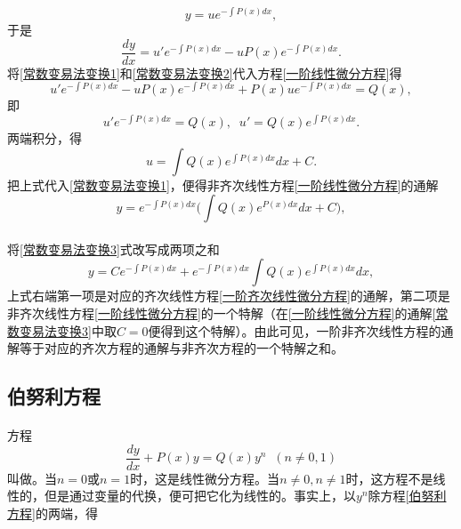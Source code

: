 \begin{equation}
  \label{常数变易法变换1}
  y = ue^{-\int P(x)dx},
\end{equation}
于是
\begin{equation}
  \label{常数变易法变换2}
  \frac{dy}{dx} = u'e^{-\int P(x)dx} - uP(x)e^{-\int P(x)dx}.
\end{equation}
将\eqref{常数变易法变换1}和\eqref{常数变易法变换2}代入方程\eqref{一阶线性微分方程}得
\begin{equation*}
  u'e^{-\int P(x)dx} - uP(x)e^{-\int P(x)dx} + P(x)ue^{-\int P(x)dx} = Q(x),
\end{equation*}
即
\begin{equation*}
  u'e^{-\int P(x)dx} = Q(x), \;\; u' = Q(x)e^{\int P(x)dx}.
\end{equation*}
两端积分，得
\begin{equation*}
  u=\int Q(x)e^{\int P(x)dx}dx + C.
\end{equation*}
把上式代入\eqref{常数变易法变换1}，便得非齐次线性方程\eqref{一阶线性微分方程}的通解
\begin{equation}
  \label{常数变易法变换3}
  y = e^{-\int P(x)dx}\big( \int Q(x)e^{P(x)dx}dx + C \big),
\end{equation}

\paragraph{}
将\eqref{常数变易法变换3}式改写成两项之和
\begin{equation*}
  y = Ce^{-\int P(x)dx} + e^{-\int P(x)dx}\int Q(x)e^{\int P(x)dx}dx,
\end{equation*}
上式右端第一项是对应的齐次线性方程\eqref{一阶齐次线性微分方程}的通解，第二项是非齐次线性方程\eqref{一阶线性微分方程}的一个特解（在\eqref{一阶线性微分方程}的通解\eqref{常数变易法变换3}中取$C=0$便得到这个特解）。由此可见，一阶非齐次线性方程的通解等于对应的齐次方程的通解与非齐次方程的一个特解之和。

\subsection{伯努利方程}
\paragraph{}
方程
\begin{equation}
  \label{伯努利方程}
  \frac{dy}{dx} + P(x)y = Q(x)y^n \;\; (n \neq 0,1)
\end{equation}
叫做。当$n=0$或$n=1$时，这是线性微分方程。当$n\neq 0, n\neq 1$时，这方程不是线性的，但是通过变量的代换，便可把它化为线性的。事实上，以$y^n$除方程\eqref{伯努利方程}的两端，得

